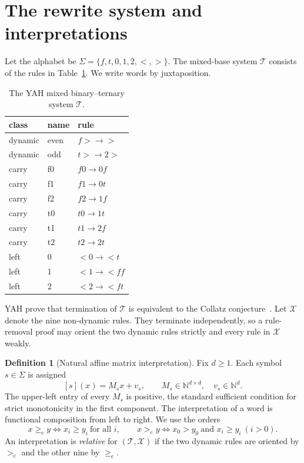 \documentclass[11pt]{article}
\theoremstyle{definition}
\newtheorem{definition}[theorem]{Definition}
\newcommand{\N}{\mathbb{N}}
\newcommand{\Tsys}{\mathcal{T}}
\newcommand{\Xsys}{\mathcal{X}}
\newcommand{\gec}{\mathrel{\geq_{\mathrm c}}}
\newcommand{\gtc}{\mathrel{>_{\mathrm c}}}
\begin{document}
\section{The rewrite system and interpretations}

Let the alphabet be
$\Sigma=\{f,t,0,1,2,<,>\}$.  The mixed-base system $\Tsys$ consists of
the rules in Table~\ref{tab:rules}.  We write words by juxtaposition.

\begin{table}[ht]
\centering
\caption{The YAH mixed binary--ternary system $\Tsys$.}
\label{tab:rules}
\begin{tabular}{lll}
\toprule
class & name & rule\\
\midrule
dynamic & even & $f>\to >$\\
dynamic & odd  & $t>\to 2>$\\
\midrule
carry & f0 & $f0\to0f$\\
carry & f1 & $f1\to0t$\\
carry & f2 & $f2\to1f$\\
carry & t0 & $t0\to1t$\\
carry & t1 & $t1\to2f$\\
carry & t2 & $t2\to2t$\\
\midrule
left & 0 & $<0\to<t$\\
left & 1 & $<1\to<ff$\\
left & 2 & $<2\to<ft$\\
\bottomrule
\end{tabular}
\end{table}

YAH prove that termination of $\Tsys$ is equivalent to the Collatz
conjecture~\cite[Theorem~3.17]{yah}.  Let $\Xsys$ denote the nine
non-dynamic rules.  They terminate independently, so a rule-removal proof
may orient the two dynamic rules strictly and every rule in $\Xsys$ weakly.

\begin{definition}[Natural affine matrix interpretation]
Fix $d\ge1$.  Each symbol $s\in\Sigma$ is assigned
\[
  [s](x)=M_sx+v_s,
  \qquad M_s\in\N^{d\times d},\quad v_s\in\N^d.
\]
The upper-left entry of every $M_s$ is positive, the standard sufficient
condition for strict monotonicity in the first component.  The
interpretation of a word is functional composition from left to right.
We use the orders
\[
 x\gec y\iff x_i\ge y_i\ \text{for all }i,
 \qquad
 x\gtc y\iff x_0>y_0\ \text{and }x_i\ge y_i\ (i>0).
\]
An interpretation is \emph{relative} for $(\Tsys,\Xsys)$ if the two dynamic
rules are oriented by $\gtc$ and the other nine by $\gec$.
\end{definition}
\end{document}
